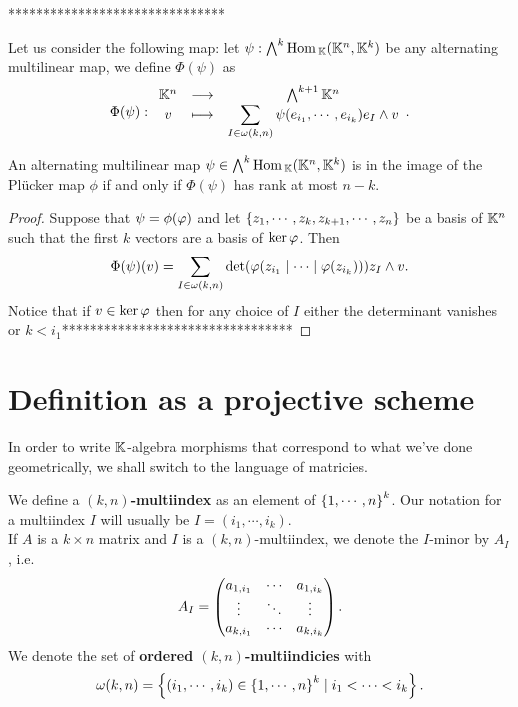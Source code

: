 *******************************
\bigskip

\noindent Let us consider the following map: let $\psi:\bigwedge^k\mathrm{Hom}\,_{\mathbb{K}}(\mathbb{K}^n,\mathbb{K}^k)$ be any alternating multilinear map, we define $\Phi(\psi)$ as
\[\Phi(\psi):\begin{array}{ccc} {\mathbb{K}^n} & \longrightarrow & {\bigwedge^{k+1}\mathbb{K}^n}\\ {v} & \longmapsto & {\displaystyle\sum_{I\in \omega(k,n)}\psi(e_{i_1},\cdots,e_{i_k})e_I\wedge v} \end{array}.\]

\begin{proposition}
An alternating multilinear map $\psi\in \bigwedge^k\mathrm{Hom}\,_{\mathbb{K}}(\mathbb{K}^n,\mathbb{K}^k)$ is in the image of the Pl\"ucker map $\phi$ if and only if $\Phi(\psi)$ has rank at most $n-k$.
\end{proposition}
\begin{proof}
Suppose that $\psi=\phi(\varphi)$ and let $\left\{{z_1,\cdots, z_k,z_{k+1},\cdots, z_{n}}\right\}$ be a basis of $\mathbb{K}^n$ such that the first $k$ vectors are a basis of $\ker \varphi$. Then
\[\Phi(\psi)(v)=\sum_{I\in \omega(k,n)}\det(\varphi(z_{i_1}\mid \cdots\mid \varphi(z_{i_k})))z_I\wedge v.\]
Notice that if $v\in\ker \varphi$ then for any choice of $I$ either the determinant vanishes or $k<i_1$*********************************
\end{proof}




















\section{Definition as a projective scheme}
In order to write $\mathbb{K}$-algebra morphisms that correspond to what we've done geometrically, we shall switch to the language of matricies.
\begin{definition}[Multiindicies]
We define a \textbf{$(k,n)$-multiindex} as an element of $\left\{{1,\cdots, n}\right\}^k$. Our notation for a multiindex $I$ will usually be $I=(i_1,\cdots, i_k)$.\\
If $A$ is a $k\times n$ matrix and $I$ is a $(k,n)$-multiindex, we denote the $I$-minor by $A_I$, i.e.
\[A_I=\begin{pmatrix}a_{1,i_1} &\cdots &a_{1,i_{k}}\\\vdots &\ddots &\vdots\\a_{k,i_1}&\cdots&a_{k,i_k}\end{pmatrix}.\]
We denote the set of \textbf{ordered $(k,n)$-multiindicies} with
\[\omega(k,n)=\left\{{(i_1,\cdots, i_k)\in \left\{{1,\cdots, n}\right\}^k\mid i_1<\cdots<i_k}\right\}.\]
\end{definition}

